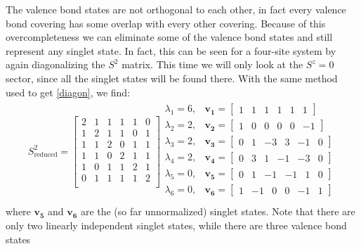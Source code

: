 The valence bond states are not orthogonal to each other, in fact every valence bond covering
has some overlap with every other covering.
Because of this overcompleteness we can eliminate some of the valence bond states and still
represent any singlet state.  
In fact, this can be seen for a four-site system by again diagonalizing the $S^2$ matrix.
This time we will only look at the $S^z=0$ sector, since all the singlet states will be found there.
With the same method used to get \eqref{diagon}, we find:
\begin{eqnarray}
S^2_{\text{reduced}} =\left[
\begin{array}{cccccc}
2&1&1&1&1&0\\
1&2&1&1&0&1\\
1&1&2&0&1&1\\
1&1&0&2&1&1\\
1&0&1&1&2&1\\
0&1&1&1&1&2\\
\end{array} \right] 
\begin{array}{cc}
\lambda_1=6,&\mathbf{v_1} =\left[\begin{array}{cccccc} 1&1&1&1&1&1\end{array} \right]\\
\lambda_2=2,&\mathbf{v_2} =\left[\begin{array}{cccccc} 1&0&0&0&0&-1\end{array} \right]\\
\lambda_3=2,&\mathbf{v_3} =\left[\begin{array}{cccccc} 0&1&-3&3&-1&0\end{array} \right]\\
\lambda_4=2,&\mathbf{v_4} =\left[\begin{array}{cccccc} 0&3&1&-1&-3&0\end{array} \right]\\
\lambda_5=0,&\mathbf{v_5} =\left[\begin{array}{cccccc} 0&1&-1&-1&1&0\end{array} \right]\\
\lambda_6=0,&\mathbf{v_6} =\left[\begin{array}{cccccc} 1&-1&0&0&-1&1\end{array} \right]\\
\end{array} 
\end{eqnarray}
where $\mathbf{v_5}$ and $\mathbf{v_6}$ are the (so far unnormalized) singlet states.
Note that there are only two linearly independent singlet states, while there are three valence bond states
